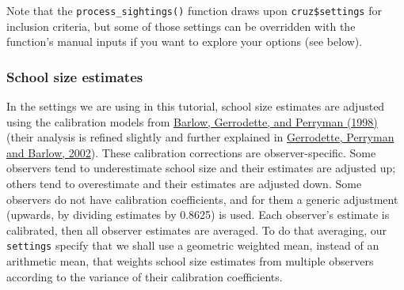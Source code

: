 \documentclass[
]{book}
\newenvironment{Shaded}{\begin{snugshade}}{\end{snugshade}}
\newcommand{\NormalTok}[1]{#1}
\newcommand{\OperatorTok}[1]{\textcolor[rgb]{0.81,0.36,0.00}{\textbf{#1}}}
\newcommand{\OtherTok}[1]{\textcolor[rgb]{0.56,0.35,0.01}{#1}}
\newcommand{\StringTok}[1]{\textcolor[rgb]{0.31,0.60,0.02}{#1}}
\begin{document}
\begin{Shaded}
\begin{Highlighting}[]
{\OperatorTok{$}\StringTok{ }\NormalTok{mixed_max        }\OperatorTok{<}\NormalTok{lgl}\OperatorTok{>}\StringTok{ }\OtherTok{TRUE}\NormalTok{, }\OtherTok{FALSE}\NormalTok{, }\OtherTok{TRUE}\NormalTok{, }\OtherTok{TRUE}
\OperatorTok{$}\StringTok{ }\NormalTok{spp_max          }\OperatorTok{<}\NormalTok{chr}\OperatorTok{>}\StringTok{ "033"}\NormalTok{, }\OtherTok{NA}\NormalTok{, }\StringTok{"033"}\NormalTok{, }\StringTok{"033"}
\OperatorTok{$}\StringTok{ }\NormalTok{included         }\OperatorTok{<}\NormalTok{lgl}\OperatorTok{>}\StringTok{ }\OtherTok{TRUE}\NormalTok{, }\OtherTok{TRUE}\NormalTok{, }\OtherTok{TRUE}\NormalTok{, }\OtherTok{TRUE}
\end{Highlighting}
\end{Shaded}

Note that the \texttt{process\_sightings()} function draws upon \texttt{cruz\$settings} for inclusion criteria, but some of those settings can be overridden with the function's manual inputs if you want to explore your options (see below).

\hypertarget{ss_calibration}{%
\subsubsection*{School size estimates}\label{ss_calibration}}

In the settings we are using in this tutorial, school size estimates are adjusted using the calibration models from \href{https://scholar.google.com/scholar?hl=en\&as_sdt=0\%2C43\&q=barlow+1998+group+size+caliration\&btnG=}{Barlow, Gerrodette, and Perryman (1998)} (their analysis is refined slightly and further explained in \href{https://scholar.google.com/scholar?hl=en\&as_sdt=0\%2C43\&q=barlow+1998+group+size+caliration\&btnG=}{Gerrodette, Perryman and Barlow, 2002}). These calibration corrections are observer-specific. Some observers tend to underestimate school size and their estimates are adjusted up; others tend to overestimate and their estimates are adjusted down. Some observers do not have calibration coefficients, and for them a generic adjustment (upwards, by dividing estimates by 0.8625) is used. Each observer's estimate is calibrated, then all observer estimates are averaged. To do that averaging, our \texttt{settings} specify that we shall use a geometric weighted mean, instead of an arithmetic mean, that weights school size estimates from multiple observers according to the variance of their calibration coefficients.
\end{document}
